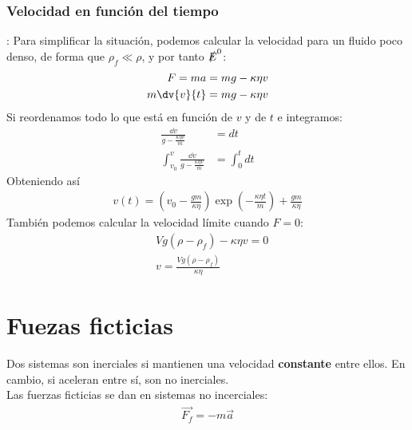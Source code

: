 \documentclass{article}
\begin{document}
\subsubsection{Velocidad en función del tiempo}:
Para simplificar la situación, podemos calcular la velocidad para un fluido
poco denso, de forma que $\rho _{f} \ll \rho $, y por tanto $\slashed{E}^0$:
\begin{equation}
    \begin{split}
        F=m a &= mg - \kappa \eta v\\
        m \dv{v}{t} &= mg -\kappa \eta v
    \end{split}
\end{equation}
Si reordenamos todo lo que está en función de $v$ y de $t$ e integramos:
\begin{equation}
    \begin{split}
        \frac{\dd{v}}{g - \frac{\kappa \eta v}{m}} &= dt\\
        \int_{v_{0}}^v \frac{\dd{v}}{g - \frac{\kappa \eta v}{m}} &=
        \int _{0}^t dt
    \end{split}
\end{equation}
Obteniendo así
\begin{equation}
    \begin{split}
        v(t) = (v_{0}- \frac{gm}{\kappa \eta })\exp(- \frac{\kappa \eta t}{m})
        + \frac{gm}{\kappa \eta }
    \end{split}
\end{equation}
También podemos calcular la velocidad límite cuando $F=0$:
\begin{equation}
    \begin{split}
        &Vg(\rho -\rho _{f})-\kappa \eta v=0\\
        & v = \frac{Vg(\rho -\rho _{f})}{\kappa \eta }
    \end{split}
\end{equation}
\section{Fuezas ficticias}
Dos sistemas son inerciales si mantienen una velocidad \textbf{constante}
entre ellos. En cambio, si aceleran entre sí, son no inerciales.\\
Las fuerzas ficticias se dan en sistemas no incerciales:
\begin{equation}
    \begin{split}
        \vec{F_{f}} = -m \vec{a}
    \end{split}
\end{equation}
\end{document}
